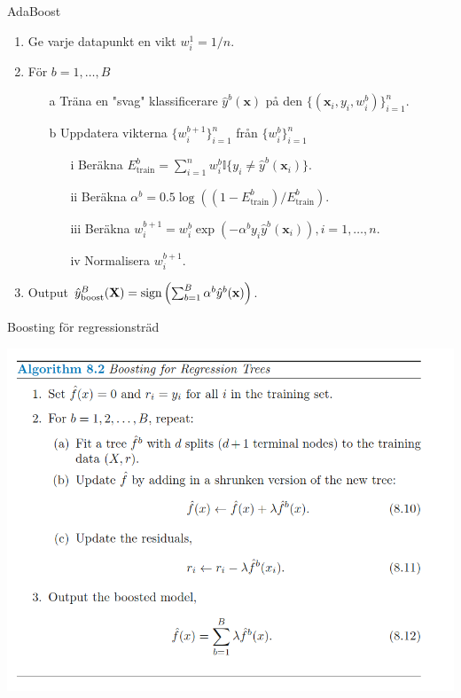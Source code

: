 \documentclass[10pt,english]{beamer}
\begin{document}
\begin{frame}{AdaBoost}

    \begin{enumerate}
        \item Ge varje datapunkt en vikt $w_i^1 = 1/n$.
        \item För $b = 1, \ldots, B$
        \begin{enumerate}
            \item[a] Träna en "svag" klassificerare $\hat{y}^{b}(\mathbf{x})$ på den  $\{(\mathbf{x}_i,y_i,w_i^b)\}_{i=1}^{n}$.
            \item[b] Uppdatera vikterna $\{w_{i}^{b+1}\}_{i=1}^{n}$ från $\{w_{i}^{b}\}_{i=1}^{n}$
            \begin{enumerate}
                \item[i] Beräkna $E_{\text{train}}^{b} = \sum_{i=1}^{n} w_{i}^{b} \mathbb{I}\{y_i \neq \hat{y}^{b}(\mathbf{x}_i)\}$.
                \item[ii] Beräkna $\alpha^{b} = 0.5 \log((1 - E_{\text{train}}^{b})/E_{\text{train}}^{b})$.
                \item[iii] Beräkna $w_{i}^{b+1} = w_i^b \exp(- \alpha^{b} y_i \hat{y}^{b}(\mathbf{x}_i)), i = 1,\ldots,n$.
                \item[iv] Normalisera $w_i^{b+1}$. 
            \end{enumerate}
        \end{enumerate}
        \item Output $\hat{y}^{B}_{\text{boost}}(\mathbf{X}) = \operatorname*{sign}\left(\sum_{b=1}^{B} \alpha^b \hat{y}^{b}(\mathbf{x})\right)$.
    \end{enumerate}
    
\end{frame}

\begin{frame}{Boosting för regressionsträd}

    \includegraphics[width=\textwidth]{figs/boosting for regression trees.png}
    
\end{frame}
\end{document}
